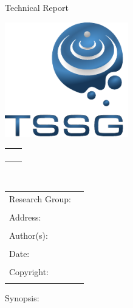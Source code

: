 \begin{titlepage}

\begin{flushright}
	Technical Report \trnumber \\
	\trname
\end{flushright}


\begin{center}
\includegraphics[height=5cm]{template/tssglogo}
\\[2.5cm]

\begin{tabularx}{\textwidth}{l p{}}
	\Large \trname \\[2pt] \\
	\Large \trsubtitle \\[2pt] \\
\end{tabularx}
\\[27.25pt]

\begin{tabularx}{\textwidth}{p{} p{}}
	Research Group: & \rgname \\[1pt] \\
	Address: & \rgaddress \\[1pt] \\
	Author(s): & \trauthors \\[1pt] \\
	Date: & \trdate \\[1pt] \\
	Copyright: & \trcopyright \\[1pt] \\	
\end{tabularx}

Synopsis: \trsynopsis

\end{center}

\end{titlepage}
